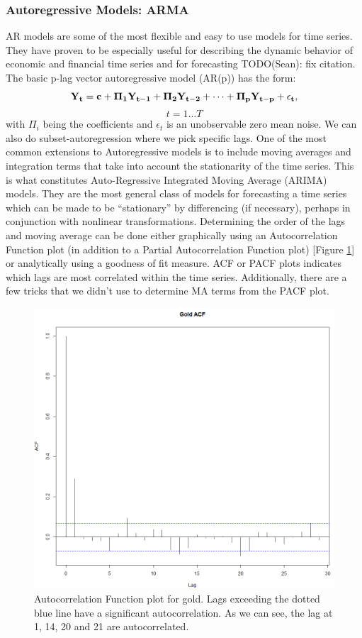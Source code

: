 \subsubsection{Autoregressive Models: ARMA}
AR models are some of the most flexible and easy to use models for time series. They have proven to be especially useful for describing the dynamic behavior of economic and financial time series and for forecasting \cite{tsay, VAR} TODO(Sean): fix citation. \\
The basic p-lag vector autoregressive model (AR(p)) has the form: $$\bf{Y}_t=\bf{c}+\bf{\Pi}_1\bf{Y}_{t-1}+\bf{\Pi}_2\bf{Y}_{t-2}+\cdots+\bf{\Pi}_p\bf{Y}_{t-p}+\epsilon_t,$$ $$t=1\ldots T$$ with $\Pi_i$ being the coefficients and $\epsilon_t$ is an unobservable zero mean noise. We can also do subset-autoregression where we pick specific lags.
One of the most common extensions to Autoregressive models is to include moving averages and integration terms that take into account the stationarity of the time series. This is what constitutes Auto-Regressive Integrated Moving Average (ARIMA) models. They are  the most general class of models for forecasting a time series which can be made to be “stationary” by differencing (if necessary), perhaps in conjunction with nonlinear transformations. 
Determining the order of the lags and moving average can be done either graphically using an Autocorrelation Function plot (in addition to a Partial Autocorrelation Function plot) [Figure \ref{fig:ACF}] or analytically using a goodness of fit measure. ACF or PACF plots indicates which lags are most correlated within the time series. Additionally, there are a few tricks that we didn't use to determine MA terms from the PACF plot.
\begin{figure}[ht]
	\vskip 0.2in
	\begin{center}
		\centerline{\includegraphics[width=\columnwidth]{ACF.png}}
		\caption{Autocorrelation Function plot for gold. Lags exceeding the dotted blue line have a significant autocorrelation. As we can see, the lag at 1, 14, 20 and 21 are autocorrelated.}
	\end{center}
	\vskip -0.2in
	\label{fig:ACF}
\end{figure}
